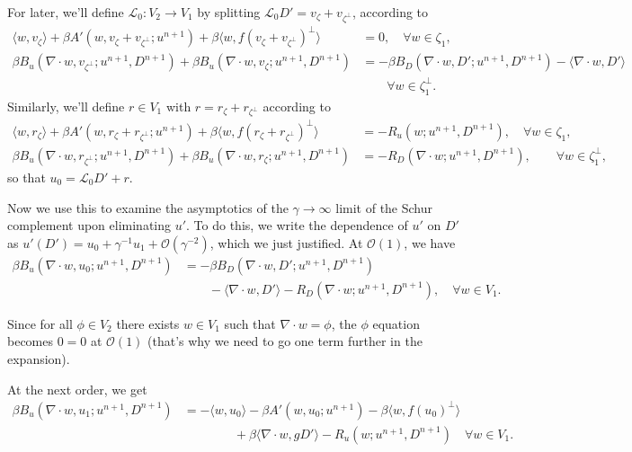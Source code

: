 \documentclass{article}
\begin{document}
For later, we'll define $\mathcal{L}_0:V_2\to V_1$ by splitting
$\mathcal{L}_0D'=v_\zeta + v_{\zeta^\perp}$, according to
\begin{align}
    \langle w, v_\zeta\rangle + \beta A'(w,v_\zeta + v_{\zeta^\perp}; u^{n+1})
  + \beta\langle w, f(v_\zeta + v_{\zeta^\perp})^\perp\rangle &= 0,
  \quad \forall w\in \zeta_1, \\
  \nonumber
   \beta B_u(\nabla\cdot w, v_{\zeta^\perp}; u^{n+1},D^{n+1})  
  + \beta B_u(\nabla\cdot w, v_\zeta; u^{n+1},D^{n+1}) & = 
  - \beta B_D(\nabla\cdot w, D'; u^{n+1},D^{n+1}) -\langle \nabla\cdot w, D' \rangle \\
  & \qquad \forall w \in \zeta_1^\perp.
\end{align}
Similarly, we'll define $r\in V_1$ with $r=r_\zeta + r_{\zeta^\perp}$ according to
\begin{align}
    \langle w, r_\zeta\rangle + \beta A'(w,r_\zeta + r_{\zeta^\perp}; u^{n+1})
  + \beta\langle w, f(r_\zeta + r_{\zeta^\perp})^\perp\rangle &= -R_u(w; u^{n+1},D^{n+1}),
  \quad \forall w\in \zeta_1, \\
   \beta B_u(\nabla\cdot w, r_{\zeta^\perp}; u^{n+1},D^{n+1})  
  + \beta B_u(\nabla\cdot w, r_\zeta; u^{n+1},D^{n+1}) & = 
-R_D(\nabla\cdot w;u^{n+1},D^{n+1}), \qquad \forall w \in \zeta_1^\perp,
\end{align}
so that $u_0 = \mathcal{L}_0D' + r$.

Now we use this to examine the asymptotics of the $\gamma\to \infty$
limit of the Schur complement upon eliminating $u'$. To do this, we
write the dependence of $u'$ on $D'$ as $u'(D') =u_0 + \gamma^{-1} u_1
+ \mathcal{O}(\gamma^{-2})$, which we just justified. At
$\mathcal{O}(1)$, we have
\begin{align}
  \nonumber \beta B_u(\nabla\cdot w, u_0; u^{n+1},D^{n+1}) & = - \beta
  B_D(\nabla\cdot w, D'; u^{n+1},D^{n+1}) \\ & \qquad -\langle
  \nabla\cdot w, D' \rangle -R_D(\nabla\cdot w;u^{n+1},D^{n+1}), \quad
  \forall w\in V_1.
\end{align}

Since for all $\phi\in V_2$ there exists $w\in V_1$ such that
$\nabla\cdot w = \phi$, the $\phi$ equation becomes $0=0$ at
$\mathcal{O}(1)$ (that's why we need to go one term further in the
expansion).

At the next order, we get
\begin{align}
  \nonumber
  \beta B_u(\nabla\cdot w, u_1; u^{n+1},D^{n+1})
  & = 
  -\langle w, u_0 \rangle - \beta A'(w, u_0; u^{n+1})
  - \beta\langle w, f(u_0)^{\perp}\rangle \\
  & \qquad\qquad
  + \beta\langle \nabla\cdot w, gD'\rangle
  -R_u(w;u^{n+1},D^{n+1})
  \quad \forall w \in V_1.
\end{align}
\end{document}

